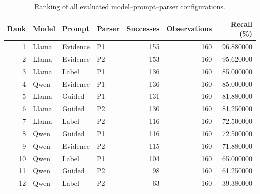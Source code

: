 \begin{table}[t]
\caption{Ranking of all evaluated model--prompt--parser configurations.}
\label{tab:configuration_rankings}
\begin{tabular}{rlllrrr}
\toprule
Rank & Model & Prompt & Parser & Successes & Observations & Recall (\%) \\
\midrule
1 & Llama & Evidence & P1 & 155 & 160 & 96.880000 \\
2 & Llama & Evidence & P2 & 153 & 160 & 95.620000 \\
3 & Llama & Label & P1 & 136 & 160 & 85.000000 \\
4 & Qwen & Evidence & P1 & 136 & 160 & 85.000000 \\
5 & Llama & Guided & P1 & 131 & 160 & 81.880000 \\
6 & Llama & Guided & P2 & 130 & 160 & 81.250000 \\
7 & Llama & Label & P2 & 116 & 160 & 72.500000 \\
8 & Qwen & Guided & P1 & 116 & 160 & 72.500000 \\
9 & Qwen & Evidence & P2 & 115 & 160 & 71.880000 \\
10 & Qwen & Label & P1 & 104 & 160 & 65.000000 \\
11 & Qwen & Guided & P2 & 98 & 160 & 61.250000 \\
12 & Qwen & Label & P2 & 63 & 160 & 39.380000 \\
\bottomrule
\end{tabular}
\end{table}
